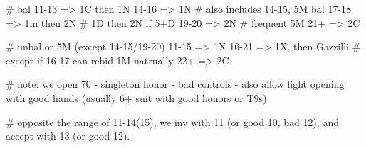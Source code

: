 # bal
11-13 => 1C then 1N
14-16 => 1N          # also includes 14-15, 5M bal
17-18 => 1m then 2N  # 1D then 2N if 5+D
19-20 => 2N          # frequent 5M
21+   => 2C

# unbal or 5M (except 14-15/19-20)
11-15 => 1X
16-21 => 1X, then Gazzilli  # except if 16-17 can rebid 1M natrually
22+   => 2C

# note: we open 70%
- singleton honor
- bad controls
- also allow light opening with good hands (usually 6+ suit with good honors or T9s)

# opposite the range of 11-14(15), we inv with 11 (or good 10, bad 12), and accept with 13 (or good 12).